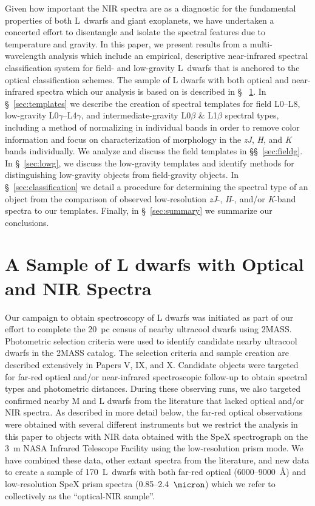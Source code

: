 \documentclass[12pt]{aastex6}
\newcommand{\sample}{170}
\begin{document}
Given how important the NIR spectra are as a diagnostic for the fundamental properties of both L~dwarfs and giant exoplanets, we have undertaken a concerted effort to disentangle and isolate the spectral features due to temperature and gravity.
In this paper, we present results from a multi-wavelength analysis which include an empirical, descriptive near-infrared spectral classification system for field- and low-gravity L~dwarfs that is anchored to the optical classification schemes.
The sample of L dwarfs with both optical and near-infrared spectra which our analysis is based on is described in \S~ \ref{sec:sample}.
In \S~\ref{sec:templates} we describe the creation of spectral templates for field L0--L8, low-gravity L0$\gamma$--L4$\gamma$, and intermediate-gravity L0$\beta$ \& L1$\beta$ spectral types, including a method of normalizing in individual bands in order to remove color information and focus on characterization of morphology in the \emph{zJ}, \emph{H}, and \emph{K} bands individually.
We analyze and discuss the field templates in \S\S~\ref{sec:fieldg}.
In \S~\ref{sec:lowg}, we discuss the low-gravity templates and identify methods for distinguishing low-gravity objects from field-gravity objects.
In \S~\ref{sec:classification} we detail a procedure for determining the spectral type of an object from the comparison of observed low-resolution \emph{zJ}-, \emph{H}-, and/or \emph{K}-band spectra to our templates.
Finally, in \S~\ref{sec:summary} we summarize our conclusions.

\section{A Sample of L dwarfs with Optical and NIR Spectra}
\label{sec:sample}

Our campaign to obtain spectroscopy of L dwarfs was initiated as part of our effort to complete the 20~pc census of nearby ultracool dwarfs using 2MASS.
Photometric selection criteria were used to identify candidate nearby ultracool dwarfs in the 2MASS catalog.
The selection criteria and sample creation are described extensively in Papers V, IX, and X.
Candidate objects were targeted for far-red optical and/or near-infrared spectroscopic follow-up to obtain spectral types and photometric distances.
During these observing runs, we also targeted confirmed nearby M and L dwarfs from the literature that lacked optical and/or NIR spectra.
As described in more detail below, the far-red optical observations were obtained with several different instruments but we restrict the analysis in this paper to objects with NIR data obtained with the SpeX spectrograph \citep{Spex} on the 3~m NASA Infrared Telescope Facility using the low-resolution prism mode.
We have combined these data, other extant spectra from the literature, and new data to create a sample of \sample~L~dwarfs with both far-red optical (6000--9000~\AA) and low-resolution SpeX prism spectra (0.85--2.4~$\micron$) which we refer to collectively as the ``optical-NIR sample''.
\end{document}
